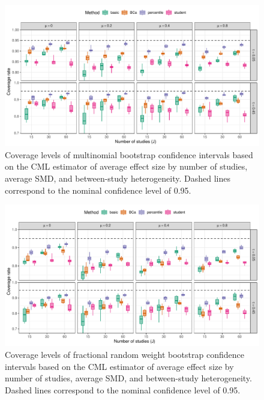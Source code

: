 \documentclass[
  american,
  man, donotrepeattitle,mask,floatsintext]{apa7}
\numberwithin{table}{section}
\numberwithin{equation}{section}
\numberwithin{figure}{section}
\begin{document}
\begin{figure}
\includegraphics{step-function-selection-models-supplementary-materials_files/figure-latex/CML-coverage-multinomial-1} \caption{Coverage levels of multinomial bootstrap confidence intervals based on the CML estimator of average effect size by number of studies, average SMD, and between-study heterogeneity. Dashed lines correspond to the nominal confidence level of 0.95.}\label{fig:CML-coverage-multinomial}
\end{figure}

\begin{figure}
\includegraphics{step-function-selection-models-supplementary-materials_files/figure-latex/CML-coverage-exponential-1} \caption{Coverage levels of fractional random weight bootstrap confidence intervals based on the CML estimator of average effect size by number of studies, average SMD, and between-study heterogeneity. Dashed lines correspond to the nominal confidence level of 0.95.}\label{fig:CML-coverage-exponential}
\end{figure}
\end{document}
